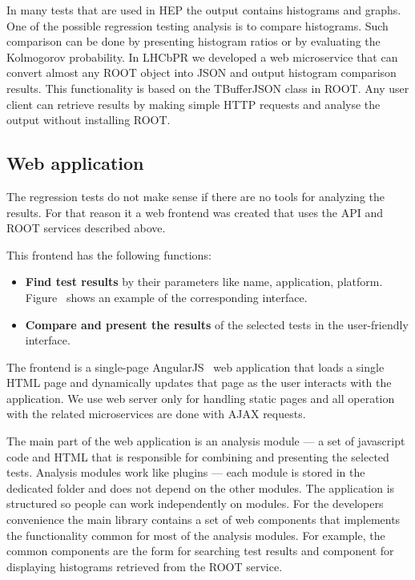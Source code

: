 \documentclass[a4paper]{jpconf}
\begin{document}
In many tests that are used in HEP the output contains histograms and graphs.
One of the possible regression testing analysis is to compare histograms. Such
comparison can be done by presenting histogram ratios or by evaluating the
Kolmogorov probability. In LHCbPR we developed a web microservice that can
convert almost any ROOT object into JSON and output histogram comparison
results. This functionality is based on the TBufferJSON class in ROOT. Any user
client can retrieve results by making simple HTTP requests and analyse the
output without installing ROOT.


\subsection{Web application}\label{sec:webapp}

The regression tests do not make sense if there are no tools for analyzing the
results. For that reason it a web frontend was created  that uses the API and
ROOT services described above.

This frontend has the following functions:
\begin{itemize}
\item \textbf{Find test results} by their parameters like name, application,
platform. Figure~ shows an example of the corresponding
interface.
\item \textbf{Compare and present the results} of the selected tests in the user-friendly interface.
\end{itemize}

The frontend is a single-page AngularJS~\cite{angular} web application that
loads a single HTML page and dynamically updates that page as the user interacts
with the application. We use web server only for handling static pages and all
operation with the related microservices are done with AJAX requests.

The main part of the web application is an analysis module --- a set of
javascript code and HTML that is responsible for combining and presenting the
selected tests. Analysis modules work like plugins --- each module is stored in
the dedicated folder and does not depend on the other modules. The application is
structured so people can work independently on modules. For the developers
convenience the main library contains a set of web components that implements
the functionality common for most of the analysis modules. For example, the
common components are the form for searching test results and component for
displaying histograms retrieved from the ROOT service.
\end{document}
